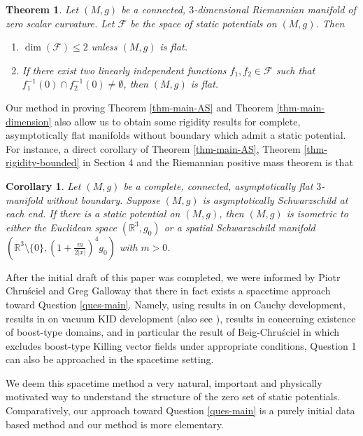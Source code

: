 \documentclass[12pt]{amsart}
\newtheorem{thm}{Theorem}[section]
\newtheorem{cor}{Corollary}[section]
\theoremstyle{remark}
\numberwithin{equation}{section}
\newcommand{\R}{\mathbb R}
\def\K{\mathcal{F}}
\begin{document}
\begin{thm}\label{thm-local-intro}
Let $(M, g)$ be a connected, $3$-dimensional Riemannian manifold of zero scalar curvature.
Let $\K$ be the space of static potentials on $(M, g)$.
Then
\begin{enumerate}
  \item [(i)] $\dim(\K)\le 2$ unless $(M,g)$ is flat.
  \item [(ii)] If there exist two linearly independent functions  $f_1, f_2\in \K$ such that 
  $f_1^{-1}(0)\cap f_2^{-1}(0) \neq \emptyset $, then $(M,g)$ is flat.
\end{enumerate}
\end{thm}

Our method in proving Theorem \ref{thm-main-AS} and Theorem  \ref{thm-main-dimension} also allow us to
obtain some rigidity  results for  complete, asymptotically flat manifolds without boundary  which admit a static potential.
For instance, a direct corollary of Theorem \ref{thm-main-AS}, Theorem \ref{thm-rigidity-bounded} in Section  4 and the
Riemannian positive mass theorem \cite{SchoenYau79, Witten81} is  that

\begin{cor}\label{cor-main-rigidity-bounded}
Let $(M, g)$ be a complete, connected,  asymptotically flat $3$-manifold without boundary.
Suppose  $(M, g)$ is asymptotically Schwarzschild at each end.
If there is  a static potential on $(M, g)$, then
 $(M, g) $ is   isometric to either the Euclidean space $(\R^3, g_0)$ or  a  spatial Schwarzschild manifold
 $ ( \R^3 \setminus \{ 0  \},  ( 1 + \frac{  m}{ 2 | x | }  )^4 g_0 ) $ with $m>0$.
 \end{cor}

After the initial draft of this paper was completed, we were  informed by  Piotr Chru\'{s}ciel
and  Greg Galloway  that  there  in fact exists a spacetime approach toward Question \ref{ques-main}.  
Namely, using results in  \cite{CG69} on Cauchy development, 
results in \cite{Moncrief76, FMM80, Chrusciel91} on 
vacuum KID development (also see \cite{BC97}),
results in \cite{CO81} concerning existence of boost-type domains, and in
 particular the result of Beig-Chru\'sciel  in \cite[Theorem 1.1]{Beig-Chrusciel-97}
 which excludes boost-type Killing vector fields under appropriate conditions, 
 Question 1 can also be {approached}  in the spacetime setting.  
 
 We deem this spacetime method  a very natural, important and physically motivated way to
understand the structure of the zero set of static potentials.
Comparatively,  our approach toward Question \ref{ques-main} 
is a purely initial data based method and    our method is   more
 elementary.
\end{document}
